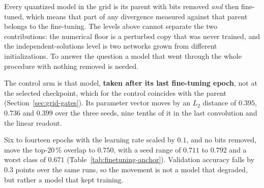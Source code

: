 Every quantized model in the grid is its parent with bits removed \emph{and} then
fine-tuned, which means that part of any divergence measured against that parent belongs to the
fine-tuning. The levels above cannot separate the two contributions: the
numerical floor is a perturbed copy that was never trained, and the
independent-solutions level is two networks grown from different
initializations. To answer the question a model that went through the whole
procedure with nothing removed is needed.

The control arm is that model, \textbf{taken after its last fine-tuning epoch}, not
at the selected checkpoint, which for the control coincides with the parent
(Section~\ref{sec:grid-gates}). Its parameter vector moves by an $L_2$ distance
of $0.395$, $0.736$ and $0.399$ over the three seeds, nine tenths of it in the
last convolution and the linear readout.

\begin{table}[htbp]
\centering
{}
\caption{The control arm after its last fine-tuning epoch, against its own
full-precision parent, twenty validation images per class at layer 2,
$\gamma = 0.5$. CoM shift is the signed difference of the temporal centre of
mass in time steps, negative when the SAM energy moves earlier. No bits are
removed in any of these runs.}
\label{tab:finetuning-anchor}
\end{table}

Six to fourteen epochs with the learning rate scaled by $0.1$, and no bits
removed, move the top-20\,\% overlap to $0.750$, with a seed range of $0.711$ to
$0.792$ and a worst class of $0.671$ (Table~\ref{tab:finetuning-anchor}).
Validation accuracy falls by $0.3$ points over the same runs, so the movement is
not a model that degraded, but rather a model that kept training.


